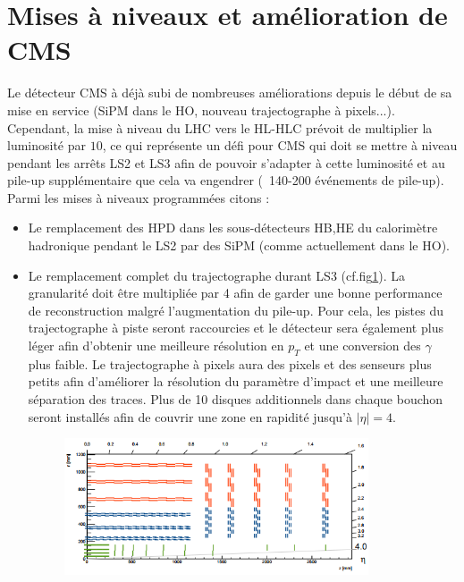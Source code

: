 \section{Mises à niveaux et amélioration de CMS}
Le détecteur CMS à déjà subi de nombreuses améliorations depuis le début de sa mise en service (SiPM dans le HO, nouveau trajectographe à pixels...). Cependant, la mise à niveau du LHC vers le HL-HLC prévoit de multiplier la luminosité par $10$, ce qui représente un défi pour CMS qui doit se mettre à niveau pendant les arrêts LS2 et LS3 afin de pouvoir s'adapter à cette luminosité et au pile-up supplémentaire que cela va engendrer (~140-200 événements de pile-up). Parmi les mises à niveaux programmées citons \cite{Collaboration:1355706} \cite{Contardo:2020886} :
\begin{itemize}[label=$\bullet$]
	\item Le remplacement des HPD dans les sous-détecteurs HB,HE du calorimètre hadronique pendant le LS2 par des SiPM (comme actuellement dans le HO).
	\item Le remplacement complet du trajectographe durant LS3 (cf.fig\ref{tracker2}). La granularité doit être multipliée par 4 afin de garder une bonne performance de reconstruction malgré l'augmentation du pile-up. Pour cela, les pistes du trajectographe à piste seront raccourcies et le détecteur sera également plus léger afin d'obtenir une meilleure résolution en $p_{T}$ et une conversion des $\gamma$ plus faible. Le trajectographe à pixels aura des pixels et des senseurs plus petits afin d'améliorer la résolution du paramètre d'impact et une meilleure séparation des traces. Plus de 10 disques additionnels dans chaque bouchon seront installés afin de couvrir une zone en rapidité jusqu'à $|\eta|=4$.
	\begin{figure}[ht!]
		\centering
		\includegraphics[width=0.85\textwidth]{CMS/tracker2.png}
		\label{tracker2}
	\end{figure}

\end{itemize}
